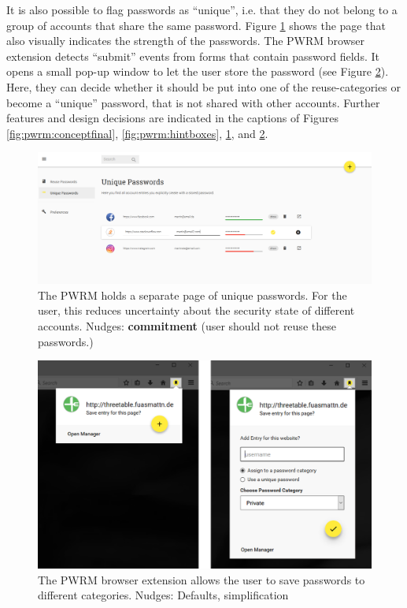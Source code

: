 It is also possible to flag passwords as ``unique'', i.e. that they do not belong to a group of accounts that share the same password. Figure \ref{fig:pwrm:entry-unique} shows the page that also visually indicates the strength of the passwords. The PWRM browser extension detects ``submit'' events from forms that contain password fields. It opens a small pop-up window to let the user store the password (see Figure \ref{fig:pwrm:extension-popus}). Here, they can decide whether it should be put into one of the reuse-categories or become a ``unique'' password, that is not shared with other accounts. Further features and design decisions are indicated in the captions of Figures \ref{fig:pwrm:conceptfinal}, \ref{fig:pwrm:hintboxes}, \ref{fig:pwrm:entry-unique}, and \ref{fig:pwrm:extension-popus}.

\begin{figure}[htbp]
	\centering
	\includegraphics[width=\linewidth]{figures/pwrm/entry-unique}
	\caption{The PWRM holds a separate page of unique passwords. For the user, this reduces uncertainty about the security state of different accounts. Nudges: \textbf{commitment} (user should not reuse these passwords.)}
	\label{fig:pwrm:entry-unique}
\end{figure}
\begin{figure}[htbp]
	\centering
	\includegraphics[width=0.9\linewidth]{figures/pwrm/extension-popus}
	\caption{The PWRM browser extension allows the user to save passwords to different categories. Nudges: Defaults, simplification}
	\label{fig:pwrm:extension-popus}
\end{figure}


